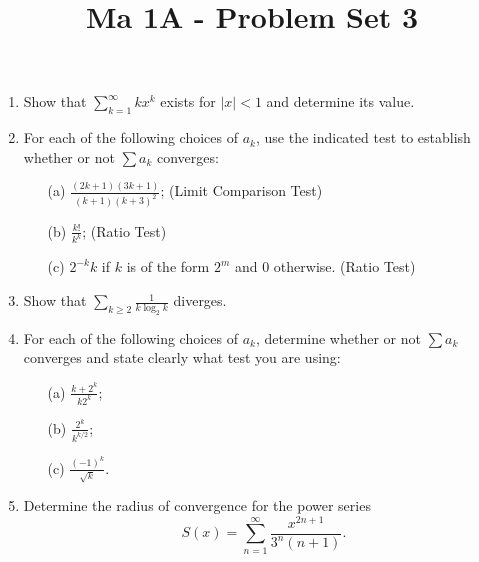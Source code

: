 \documentclass[11pt]{article}
\title{\vspace{-0.7cm}Ma 1A - Problem Set 3}
\date{}
\begin{document}
\maketitle

\begin{enumerate}

\item
Show that $\sum_{k=1}^\infty k x^k$ exists for $|x| < 1$ and determine its value.

\item
For each of the following choices of $a_k$, use the indicated test to establish whether or not $\sum a_k$ converges:
\begin{itemize}
\item[(a)] $\frac{(2k+1)(3k+1)}{(k+1)(k+3)^2}$; \hfill (Limit Comparison Test)
\item[(b)] $\frac{k!}{k^k}$; \hfill (Ratio Test)
\item[(c)] $2^{-k} k$ if $k$ is of the form $2^m$ and $0$ otherwise. \hfill (Ratio Test)
\end{itemize}

\item
Show that $\sum_{k \geq 2} \frac{1}{k \log_2 k}$ diverges.


\item
For each of the following choices of $a_k$, determine whether or not $\sum a_k$ converges and state clearly what test you are using:
\begin{itemize}
\item[(a)] $\frac{k+2^k}{k 2^k}$;
\item[(b)] $\frac{2^k}{k^{k/2}}$; 
\item[(c)] $\frac{(-1)^k}{\sqrt{k}}$.
\end{itemize}

\item
Determine the radius of convergence for the power series 
\[S(x) = \sum_{n=1}^\infty \frac{x^{2n+1}}{3^n (n+1)}.\]

\end{enumerate}
\end{document}

